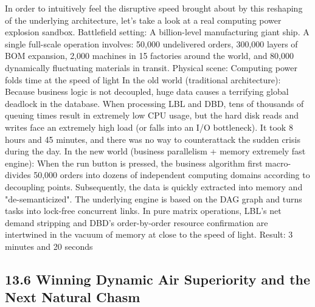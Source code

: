 \documentclass[11pt,a4paper]{article}
\begin{document}
In order to intuitively feel the disruptive speed brought about by this reshaping of the underlying architecture, let’s take a look at a real computing power explosion sandbox. Battlefield setting: A billion-level manufacturing giant ship. A single full-scale operation involves: 50,000 undelivered orders, 300,000 layers of BOM expansion, 2,000 machines in 15 factories around the world, and 80,000 dynamically fluctuating materials in transit. Physical scene: Computing power folds time at the speed of light In the old world (traditional architecture): Because business logic is not decoupled, huge data causes a terrifying global deadlock in the database. When processing LBL and DBD, tens of thousands of queuing times result in extremely low CPU usage, but the hard disk reads and writes face an extremely high load (or falls into an I/O bottleneck). It took 8 hours and 45 minutes, and there was no way to counterattack the sudden crisis during the day. In the new world (business parallelism + memory extremely fast engine): When the run button is pressed, the business algorithm first macro-divides 50,000 orders into dozens of independent computing domains according to decoupling points. Subsequently, the data is quickly extracted into memory and "de-semanticized". The underlying engine is based on the DAG graph and turns tasks into lock-free concurrent links. In pure matrix operations, LBL's net demand stripping and DBD's order-by-order resource confirmation are intertwined in the vacuum of memory at close to the speed of light. Result: 3 minutes and 20 seconds


\subsection*{13.6 Winning Dynamic Air Superiority and the Next Natural Chasm}
\end{document}
